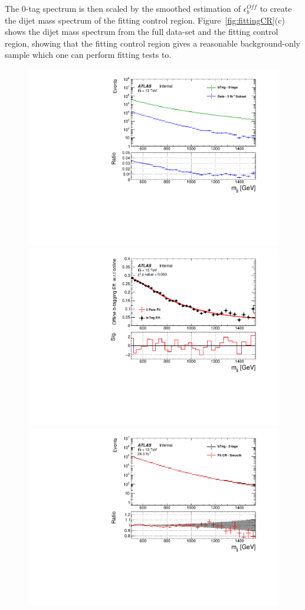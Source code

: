 The 0-tag spectrum is then scaled by the smoothed estimation of $\epsilon_b^{Off}$ to create the dijet mass spectrum of the fitting control region.
Figure~\ref{fig:fittingCR}(c) shows the dijet mass spectrum from the full \lm{} data-set and the fitting control region,
showing that the fitting control region gives a reasonable background-only sample which one can perform fitting tests to.

\begin{figure}[!htb]
\captionsetup[subfigure]{aboveskip=0pt,justification=centering}
\centering
\hspace{-2mm}
\subcaptionbox{} {
  \includegraphics[width=0.51\linewidth, angle=0]{figs/Dibjet/LowMass/FitStudy/corrFitCR_0tag_subset.pdf}\vspace{-1mm}
}\hspace{-8mm}
\subcaptionbox{} {
  \includegraphics[width=0.51\linewidth, angle=0]{figs/Dibjet/LowMass/FitStudy/corrFitCR_5parFit.pdf}\vspace{-1mm}
} \hspace{-2mm} \vspace{1.5em}
\hspace{-2mm}
\subcaptionbox{} {
  \includegraphics[width=0.51\linewidth, angle=0]{figs/Dibjet/LowMass/FitStudy/corrFitCR_dataComp.pdf}\vspace{-1mm}
}
\end{figure}
